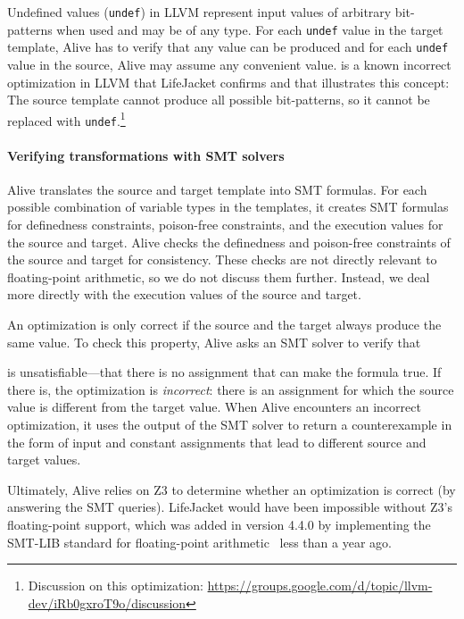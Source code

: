 \documentclass[preprint, numbers]{sigplanconf}
\newcommand{\xxx}{LifeJacket}
\begin{document}
Undefined values (\texttt{undef}) in LLVM represent input values of arbitrary
bit-patterns when used and may be of any type. For each \texttt{undef} value in
the target template, Alive has to verify that any value can be produced and for
each \texttt{undef} value in the source, Alive may assume any convenient value.
 is a known incorrect optimization in LLVM that \xxx{} confirms
and that illustrates this concept: The source template cannot produce all
possible bit-patterns, so it cannot be replaced with
\texttt{undef}.\footnote{Discussion on this optimization:
\url{https://groups.google.com/d/topic/llvm-dev/iRb0gxroT9o/discussion}}

\paragraph{Verifying transformations with SMT solvers}
Alive translates the source and target template into SMT formulas.
For each possible combination of variable types in the templates,
it creates SMT formulas for definedness constraints, poison-free constraints,
and the execution values for the source and target. Alive checks
the definedness and poison-free constraints of the source and target for
consistency. These checks are not directly relevant to floating-point
arithmetic, so we do not discuss them further. Instead, we deal more directly with
the execution values of the source and target. 

An optimization is only correct if the source and the target always produce the
same value. To check this property, Alive asks an SMT solver to verify that

is unsatisfiable---that there is no assignment that can make the formula true.
If there is, the optimization is \textit{incorrect}: there is an assignment for
which the source value is different from the target value. When Alive
encounters an incorrect optimization, it uses the output of the SMT solver to
return a counterexample in the form of input and constant assignments that lead
to different source and target values.



Ultimately, Alive relies on Z3 to determine whether an optimization is correct
(by answering the SMT queries). \xxx{} would have been impossible without Z3's
floating-point support, which was added in version 4.4.0 by implementing the
SMT-LIB standard for floating-point arithmetic~\cite{smtFPA2010} less than a
year ago.
\end{document}
